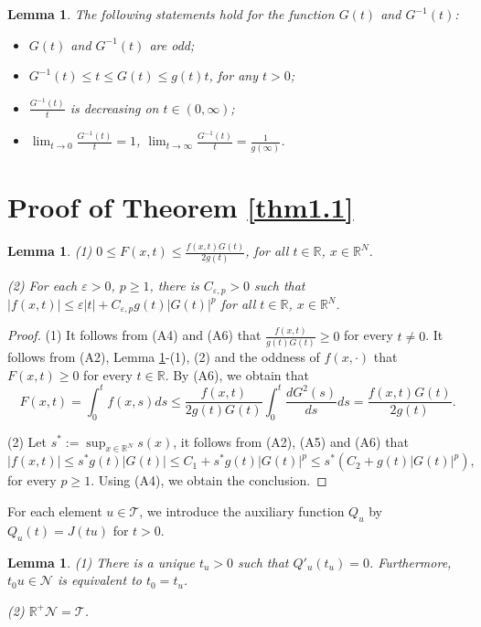 \documentclass[10pt,a4paper]{amsart}
\numberwithin{equation}{section}
\newtheorem{lemma}[theorem]{Lemma}
\begin{document}
\begin{lemma}\label{L2.1} The following statements hold for the function $G(t)$ and $G^{-1}(t)$:
\begin{itemize}
  \item[(1)] $G(t)$ and $G^{-1}(t)$ are odd;
  \item[(2)]  $G^{-1}(t)\leq t\leq G(t)\leq g(t)t$, for any $t>0$;
  \item[(3)] $\frac{G^{-1}(t)}{t}$ is decreasing on $t\in(0,\infty)$;
  \item[(4)] $\lim_{t\to 0}\frac{G^{-1}(t)}{t}=1$, $\lim_{t\to \infty}\frac{G^{-1}(t)}{t}=\frac{1}{g(\infty)}$.
\end{itemize}
\end{lemma}

\section{Proof of Theorem \ref{thm1.1}}  \label{s3}

\begin{lemma}\label{L3.1} 
(1)  $0\leq F(x,t)\leq \frac{f(x,t)G(t)}{2g(t)}$, for all $t\in \mathbb{R}$, $x\in{\mathbb{R}^N}$.

(2) For each $\varepsilon >0$, $p\geq1$, there is $C_{\varepsilon, p}>0$ such that
$|f(x,t)|\leq \varepsilon |t|+C_{\varepsilon, p} g(t)|G(t)|^{p}$ for all $t\in \mathbb{R}$, $x\in{\mathbb{R}^N}$.
\end{lemma}

\begin{proof}
(1) It follows from (A4) and (A6) that $\frac{f(x,t)}{g(t)G(t)}\geq 0$ for every $t\neq0$. 
It follows from (A2), Lemma \ref{L2.1}-(1), (2) and the oddness of $f(x,\cdot)$ that 
$F(x,t)\geq 0$ for every $t\in \mathbb{R}$. By (A6), we obtain that
$$
F(x,t)=\int^t_0f(x,s)ds\leq \frac{f(x,t)}{2g(t)G(t)}\int^t_0\frac{dG^2(s)}{ds}ds
=\frac{f(x,t)G(t)}{2g(t)}.
$$

(2) Let $s^*:=\sup_{x\in{\mathbb{R}^N}}s(x)$, it follows from (A2), (A5) and (A6) that 
$$
|f(x,t)|\leq s^*g(t)|G(t)|\leq C_1+s^*g(t)|G(t)|^p\leq s^*(C_2+g(t)|G(t)|^p),
$$ 
for every $p\geq1$. Using (A4), we obtain  the conclusion.
\end{proof}

For each element  \( u \in \mathcal{T} \), we introduce the auxiliary function 
\( Q_u  \) by \( Q_u(t) = J(tu) \) for $t>0$.


\begin{lemma}\label{L3.2}
(1) There is a unique $t_u>0$ such that $Q'_u(t_u)=0$. Furthermore,  $t_0u\in\mathcal{N}$  is equivalent to  $t_0=t_u$.

(2) $\mathbb{R}^+\mathcal{N}=\mathcal{T}$.
\end{lemma}
\end{document}
